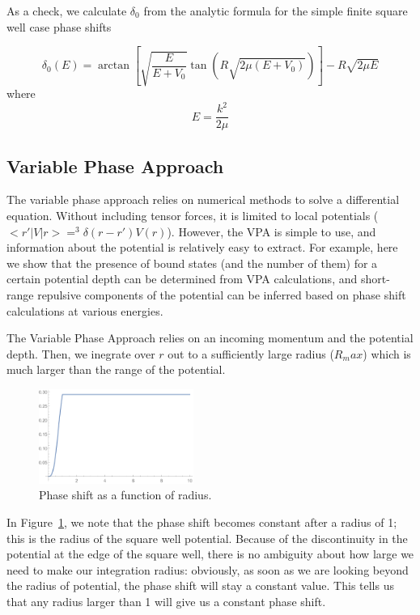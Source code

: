\documentclass[10pt,showpacs,preprintnumbers,footinbib,amsmath,amssymb,aps,prl,twocolumn,groupedaddress,superscriptaddress,showkeys]{revtex4-1}
\begin{document}
As a check, we calculate
$\delta _0$ from the analytic formula for the simple finite square well case phase shifts

\begin{equation}
	\delta _0(E) = \arctan \left [ \sqrt{\frac{E}{E+V_0}} \tan \left ( R \sqrt{2 \mu (E + V_0)}
 \right ) \right ] - R \sqrt{2 \mu E}
	\label{eq:deltaAnalytic}
\end{equation}
where
\begin{equation*}
	E = \frac{k^2}{2 \mu}
\end{equation*}


\subsection{Variable Phase Approach}
The variable phase approach relies on numerical methods to solve a differential equation.
Without including tensor forces,
it is limited to local potentials ($<r'|V|r>=^3\delta(r-r')V(r)$). However, the VPA is simple to use,
and information about the potential is relatively easy to extract. For example, here we show
that the presence of bound states (and the number of them) for a certain potential depth can
be determined from VPA calculations, and short-range repulsive components of the potential can
be inferred based on phase shift calculations at various energies.

The Variable Phase Approach relies on an incoming momentum and the potential depth.
Then, we inegrate over $r$ out to a sufficiently large radius ($R_max$) which is much larger
than the range of the potential. 

\begin{figure}
\centering
\includegraphics[width=0.45\textwidth]{figures/VPA_plot.pdf}
\caption{Phase shift as a function of radius.}
\label{fig:VPA}
\end{figure}

In Figure~\ref{fig:VPA}, we note that the phase shift becomes constant after a radius of 1;
this is the radius of the square well potential. Because of the discontinuity in the potential at the
edge of the square well, there is no ambiguity about how large we need to make our integration
radius: obviously, as soon as we are looking beyond the radius of potential, the phase shift will
stay a constant value. This tells us that any radius larger than 1 will give us a constant phase shift.
\end{document}
